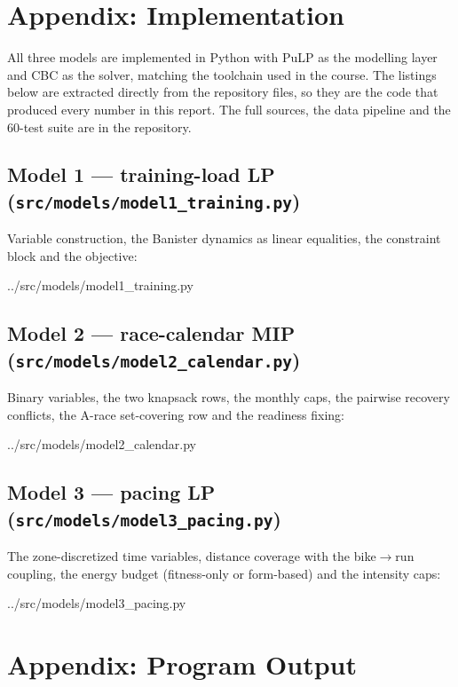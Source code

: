 \documentclass[11pt,a4paper]{article}
\begin{document}
\appendix
\small
\section{Appendix: Implementation}
\label{sec:code}

All three models are implemented in Python with PuLP as the modelling layer and
CBC as the solver, matching the toolchain used in the course. The listings below
are extracted directly from the repository files, so they are the code that
produced every number in this report. The full sources, the data pipeline and
the 60-test suite are in the repository.

\subsection{Model 1 --- training-load LP (\texttt{src/models/model1\_training.py})}

Variable construction, the Banister dynamics as linear equalities, the
constraint block and the objective:

%
{../src/models/model1_training.py}

\subsection{Model 2 --- race-calendar MIP (\texttt{src/models/model2\_calendar.py})}

Binary variables, the two knapsack rows, the monthly caps, the pairwise recovery
conflicts, the A-race set-covering row and the readiness fixing:

%
{../src/models/model2_calendar.py}

\subsection{Model 3 --- pacing LP (\texttt{src/models/model3\_pacing.py})}

The zone-discretized time variables, distance coverage with the bike$\to$run
coupling, the energy budget (fitness-only or form-based) and the intensity caps:

%
{../src/models/model3_pacing.py}

\section{Appendix: Program Output}
\label{sec:output}
\end{document}
